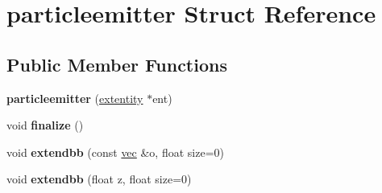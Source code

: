 \hypertarget{structparticleemitter}{}\section{particleemitter Struct Reference}
\label{structparticleemitter}
\subsection*{Public Member Functions}
\begin{DoxyCompactItemize}
\item 
\mbox{\label{structparticleemitter_a4eb1179aede3d1bea8e1b0615bbeba30}} 
{\bfseries particleemitter} (\hyperlink{structextentity}{extentity} $\ast$ent)
\item 
\mbox{\label{structparticleemitter_a480236004d5b0292fc3ffec266cd63ef}} 
void {\bfseries finalize} ()
\item 
\mbox{\label{structparticleemitter_ae2028f2bc3d5716938b60090ff84e3c6}} 
void {\bfseries extendbb} (const \hyperlink{structvec}{vec} \&o, float size=0)
\item 
\mbox{\label{structparticleemitter_a391adf9e6e445e16e94c7e7bc010bd81}} 
void {\bfseries extendbb} (float z, float size=0)
\end{DoxyCompactItemize}
